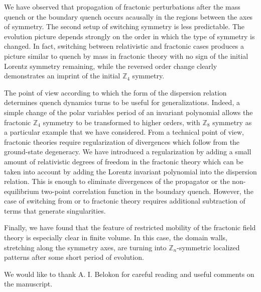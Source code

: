 \documentclass[a4paper,12pt]{article}
\newcommand{\Z}[1]{\mathbb{Z}_{#1}}
\begin{document}
We have observed that propagation of fractonic perturbations after the mass quench or the boundary quench occurs acausally in the regions between the axes of symmetry. The second setup of switching symmetry is less predictable. The evolution picture depends strongly on the order in which the type of symmetry is changed. In fact, switching between relativistic and fractonic cases produces a picture similar to quench by mass in fractonic theory with no sign of the initial Lorentz symmetry remaining, while the reversed order change clearly demonstrates an imprint of the initial $\Z4$ symmetry.

The point of view according to which the form of the dispersion relation determines quench dynamics turns to be useful for generalizations. Indeed, a simple change of the polar variables period of an invariant polynomial allows the fractonic $\Z4$ symmetry to be transformed to higher orders, with $\Z8$ symmetry as a particular example that we have considered. From a technical point of view, fractonic theories require regularization of divergences which follow from the ground-state degeneracy. We have introduced a regularization by adding a small amount of relativistic degrees of freedom in the fractonic theory which can be taken into account by adding the Lorentz invariant polynomial into the dispersion relation. This is enough to eliminate divergences of the propagator or the non-equilibrium two-point correlation function in the boundary quench. However, the case of switching from or to fractonic theory requires additional subtraction of terms that generate singularities.

Finally, we have found that the feature of restricted mobility of the fractonic field theory is especially clear in finite volume. In this case, the domain walls, stretching along the symmetry axes, are turning into $\Z{n}$-symmetric localized patterns after some short period of evolution.

\acknowledgments

We would like to thank A. I. Belokon for careful reading and useful comments on the manuscript.



\end{document}
